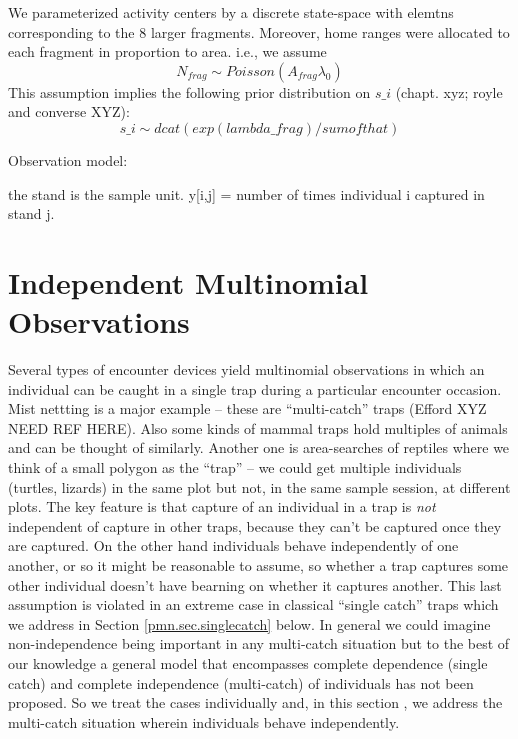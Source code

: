 {We parameterized activity centers by a discrete state-space with elemtns
corresponding to the 8 larger fragments. Moreover, home ranges were allocated
to each fragment in 
proportion to area. i.e., we assume
\[
 N_{frag} \sim Poisson(A_{frag} \lambda_{0} )
\]
This assumption implies the following prior distribution on $s\_{i}$ (chapt.
xyz; royle and converse XYZ):
\[
s\_{i} \sim  dcat(  exp( lambda\_frag ) / sum of that )
\]

Observation model:  

the stand is the sample unit.
y[i,j] = number of times individual i captured in stand j.













\section{Independent Multinomial Observations}

Several types of encounter devices yield multinomial observations in
which an individual can be caught in a single trap during a particular
encounter occasion.  Mist nettting is a major example -- these are
``multi-catch'' traps (Efford XYZ NEED REF HERE). Also some kinds of
mammal traps hold multiples of animals and can be thought of
similarly. Another one is area-searches of reptiles where we think of
a small polygon as the ``trap'' -- we could get multiple individuals
(turtles, lizards) in the same plot but not, in the same sample
session, at different plots.  The key feature is that capture of an
individual in a trap is {\it not} independent of capture in other
traps, because they can't be captured once they are captured. On the
other hand individuals behave independently of one another, or so it
might be reasonable to assume, so whether a trap captures some other
individual doesn't have bearning on whether it captures another.  This
last assumption is violated in an extreme case in classical ``single
catch'' traps which we address in Section \ref{pmn.sec.singlecatch}
below. In general we could imagine non-independence being important in
any multi-catch situation but to the best of our knowledge a general
model that encompasses complete dependence (single catch) and complete
independence (multi-catch) of individuals has not been proposed.  So
we treat the cases individually and, in this section , we address the
multi-catch situation wherein individuals behave independently.


}
